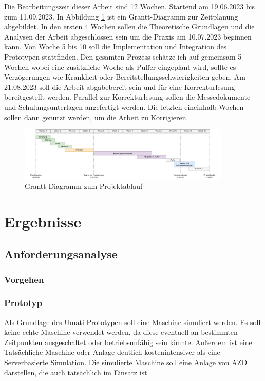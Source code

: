 \documentclass[a4paper, 12pt, oneside]{scrbook}
\begin{document}
	Die Bearbeitungszeit dieser Arbeit sind 12 Wochen. Startend am 19.06.2023 bis zum 11.09.2023. In Abbildung \ref{fig:Grantt} ist ein Grantt-Diagramm zur Zeitplanung abgebildet. In den ersten 4 Wochen sollen die Theoretische Grundlagen und die Analysen der Arbeit abgeschlossen sein um die Praxis am 10.07.2023 beginnen kann. Von Woche 5 bis 10 soll die Implementation und Integration des Prototypen stattfinden. Den gesamten Prozess schätze ich auf gemeinsam 5 Wochen wobei eine zusätzliche Woche als Puffer eingeplant wird, sollte es Verzögerungen wie Krankheit oder Bereitstellungsschwierigkeiten geben. Am 21.08.2023 soll die Arbeit abgabebereit sein und für eine Korrekturlesung bereitgestellt werden. Parallel zur Korrekturlesung sollen die Messedokumente und Schulungsunterlagen angefertigt werden. Die letzten eineinhalb Wochen sollen dann genutzt werden, um die Arbeit zu Korrigieren.
	
	\begin{figure}[H]
		\centering
		\includegraphics[width=0.9\textwidth]{res/analysen/Grantt-Diagramm.pdf}
		\caption{Grantt-Diagramm zum Projektablauf}
		\label{fig:Grantt}
	\end{figure}
	
	
\chapter{Ergebnisse}\label{ch:Ergebnisse}
	
	
	\section{Anforderungsanalyse}
	
		\subsection{Vorgehen}
		
		
		\subsection{Prototyp}
		Als Grundlage des Umati-Prototypen soll eine Maschine simuliert werden. Es soll keine echte Maschine verwendet werden, da diese eventuell an bestimmten Zeitpunkten ausgeschaltet oder betriebsunfähig sein könnte. Außerdem ist eine Tatsächliche Maschine oder Anlage deutlich kostenintensiver als eine Serverbasierte Simulation. Die simulierte Maschine soll eine Anlage von AZO darstellen, die auch tatsächlich im Einsatz ist. %
		
\end{document}
